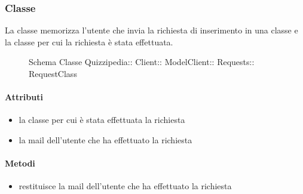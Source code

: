 \subsubsection{Classe }
La classe memorizza l'utente che invia la richiesta di inserimento in una classe e la classe per cui la richiesta è stata effettuata.
\begin{figure}[H]
\centering
\noindent{}
\caption[Schema Classe RequestClass]{Schema Classe Quizzipedia:: Client:: ModelClient:: Requests:: RequestClass}
\end{figure}
\paragraph{Attributi}
\begin{itemize}
\item {}
\newline
la classe per cui è stata effettuata la richiesta
\item {}
\newline
la mail dell'utente che ha effettuato la richiesta
\end{itemize}
\paragraph{Metodi}
\begin{itemize}
\item {}
\newline
restituisce la mail dell'utente che ha effettuato la richiesta
\newline
\end{itemize}
